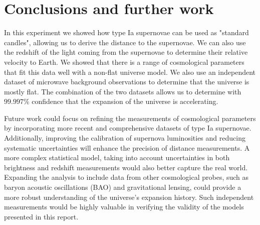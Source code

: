 \documentclass[11pt]{article}
\begin{document}
\section{Conclusions and further work} \label{sec:conclusions}
In this experiment we showed how type Ia supernovae can be used as "standard candles", allowing us to derive the distance to the supernovae. We can also use the redshift of the light coming from the supernovae to determine their relative velocity to Earth. We showed that there is a range of cosmological parameters that fit this data well with a non-flat universe model. We also use an independent dataset of microwave background observations to determine that the universe is mostly flat. The combination of the two datasets allows us to determine with $99.997\%$ confidence that the expansion of the universe is accelerating. 

Future work could focus on refining the measurements of cosmological parameters by incorporating more recent and comprehensive datasets of type Ia supernovae. Additionally, improving the calibration of supernova luminosities and reducing systematic uncertainties will enhance the precision of distance measurements. A more complex statistical model, taking into account uncertainties in both brightness and redshift measurements would also better capture the real world. Expanding the analysis to include data from other cosmological probes, such as baryon acoustic oscillations (BAO) and gravitational lensing, could provide a more robust understanding of the universe's expansion history. Such independent measurements would be highly valuable in verifying the validity of the models presented in this report. 





\end{document}
